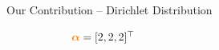 \documentclass{slides}
\begin{document}
\begin{xframe}{Our Contribution -- {\small Dirichlet Distribution}}
\begin{center}
{\begin{figure}
\begin{subfigure}{0.32\textwidth}
{    \caption{$\textcolor{orange}{\boldsymbol{\alpha}}=[2, 2, 2]^{\top}$}
    }
\end{subfigure}
\hfill
\begin{subfigure}{0.32\textwidth}
\end{subfigure}


\end{figure}}
\end{center}
\end{xframe}
\end{document}
